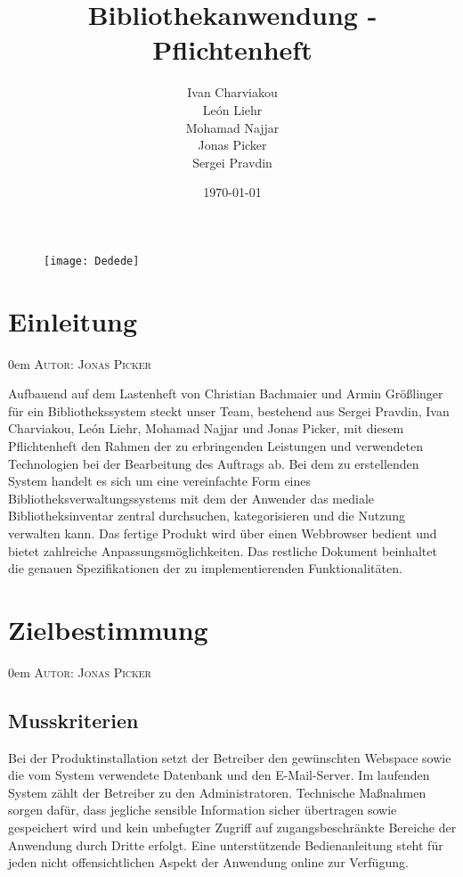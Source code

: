 \documentclass{article}
\title{Bibliothekanwendung - Pflichtenheft}
\date{\today}
\author{
	Ivan Charviakou\\
	León Liehr\\
	Mohamad Najjar\\
	Jonas Picker\\
	Sergei Pravdin
}
\makeatletter
\newcommand{\sectionauthor}[1]{
	{\parindent 0em \large \scshape Autor: #1 \par \nobreak \vspace*{2em}}
	\@afterheading
}
\makeatother
\begin{document}
\maketitle
\begin{figure}[h]
	\centering
	\texttt{[image: Dedede]}
\end{figure}
\newpage

\tableofcontents
\newpage

\section{Einleitung} %
\sectionauthor{Jonas Picker}
Aufbauend auf dem Lastenheft von Christian Bachmaier und Armin Größlinger für ein Bibliothekssystem steckt unser Team, bestehend aus Sergei Pravdin, Ivan Charviakou, León Liehr, Mohamad Najjar und Jonas Picker, mit diesem Pflichtenheft den Rahmen der zu erbringenden Leistungen und verwendeten Technologien bei der Bearbeitung des Auftrags ab. Bei dem zu erstellenden System handelt es sich um eine vereinfachte Form eines Bibliotheksverwaltungssystems mit dem der Anwender das mediale Bibliotheksinventar zentral durchsuchen, kategorisieren und die Nutzung verwalten kann. Das fertige Produkt wird über einen Webbrowser bedient und bietet zahlreiche Anpassungsmöglichkeiten. Das restliche Dokument beinhaltet die genauen Spezifikationen der zu implementierenden Funktionalitäten.
\newpage

\section{Zielbestimmung} %
\sectionauthor{Jonas Picker}

\subsection{Musskriterien}
Bei der Produktinstallation setzt der Betreiber den gewünschten Webspace sowie die vom System verwendete Datenbank und den E-Mail-Server. Im laufenden System zählt der Betreiber zu den Administratoren. Technische Maßnahmen sorgen dafür, dass jegliche sensible Information sicher übertragen sowie gespeichert wird und kein unbefugter Zugriff auf zugangsbeschränkte Bereiche der Anwendung durch Dritte erfolgt. Eine unterstützende Bedienanleitung steht für jeden nicht offensichtlichen Aspekt der Anwendung online zur Verfügung.
\end{document}
